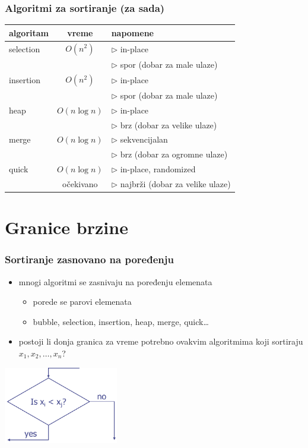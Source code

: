 \documentclass[compress,aspectratio=169]{beamer}
\begin{document}
\begin{frame}[fragile]
  \frametitle{Algoritmi za sortiranje (za sada)}
  \begin{tabular}{l|c|p{6cm}}
  \textbf{algoritam} & \textbf{vreme} & \textbf{napomene} \\ \hline\hline
  selection & $O(n^2)$ & $\rhd$ in-place \\ 
   &  & $\rhd$ spor (dobar za male ulaze) \\ \hline
  insertion & $O(n^2)$ & $\rhd$ in-place \\ 
   &  & $\rhd$ spor (dobar za male ulaze) \\ \hline
  heap & $O(n\log n)$ & $\rhd$ in-place \\
   &  & $\rhd$ brz (dobar za velike ulaze) \\ \hline
  merge & $O(n\log n)$ & $\rhd$ sekvencijalan \\
   &  & $\rhd$ brz (dobar za ogromne ulaze) \\ \hline
  quick & $O(n\log n)$ & $\rhd$ in-place, randomized \\
   & {\tiny očekivano} & $\rhd$ najbrži (dobar za velike ulaze) \\ \hline
  \end{tabular}
\end{frame}

\section[Granice brzine]{Granice brzine}

\begin{frame}[fragile]
  \frametitle{Sortiranje zasnovano na poređenju}
  \begin{itemize}
    \item mnogi algoritmi se zasnivaju na poređenju elemenata
    \begin{itemize}
      \item porede se parovi elemenata 
      \item bubble, selection, insertion, heap, merge, quick\ldots
    \end{itemize}
    \item postoji li donja granica za vreme potrebno ovakvim algoritmima koji sortiraju $x_1, x_2, \ldots, x_n$?
  \end{itemize}
  \begin{center}
    \includegraphics[width=5cm]{asp-12-pic28.png}
  \end{center}
\end{frame}
\end{document}
